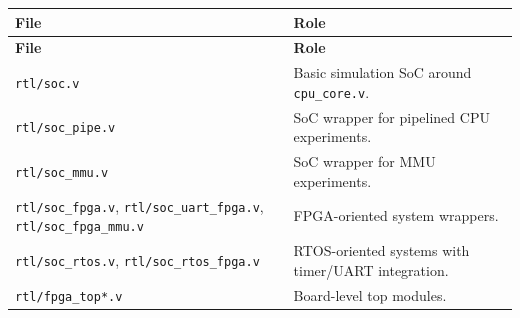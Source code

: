 \begin{longtable}{|>{\RaggedRight\arraybackslash}p{}|>{\RaggedRight\arraybackslash}p{}|}
\hline
\textbf{File} & \textbf{Role} \\
\hline
\endfirsthead
\hline
\textbf{File} & \textbf{Role} \\
\hline
\endhead
\texttt{rtl/soc.v} & Basic simulation SoC around \texttt{cpu\_core.v}. \\
\hline
\texttt{rtl/soc\_pipe.v} & SoC wrapper for pipelined CPU experiments. \\
\hline
\texttt{rtl/soc\_mmu.v} & SoC wrapper for MMU experiments. \\
\hline
\texttt{rtl/soc\_fpga.v}, \texttt{rtl/soc\_uart\_fpga.v}, \texttt{rtl/soc\_fpga\_mmu.v} & FPGA-oriented system wrappers. \\
\hline
\texttt{rtl/soc\_rtos.v}, \texttt{rtl/soc\_rtos\_fpga.v} & RTOS-oriented systems with timer/UART integration. \\
\hline
\texttt{rtl/fpga\_top*.v} & Board-level top modules. \\
\hline
\end{longtable}

\bigskip
